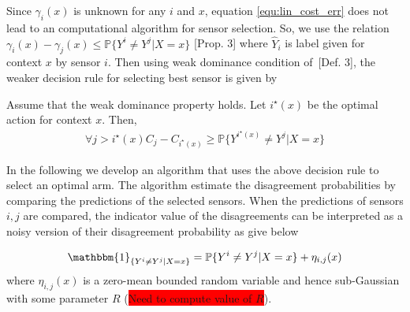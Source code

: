 Since $\gamma_i(x)$ is unknown for any $i$ and $x$, equation \eqref{equ:lin_cost_err} does not lead to an computational algorithm for sensor selection. So, we use the relation $\gamma_i(x)-\gamma_j(x)\leq\mathbb{P}\{Y^i\neq Y^j| X=x\}$ \cite{hanawal2017unsupervised}[Prop. 3] where $\widehat{Y}_i$ is label given for context $x$ by sensor $i$. Then using weak dominance condition of~\cite{hanawal2017unsupervised}[Def. 3], the weaker decision rule for selecting best sensor is given by

\begin{proposition}
Assume that the weak dominance property holds. Let $i^\star(x)$ be the optimal action for context $x$.	Then,
\begin{align}
\label{equ:selection_label}
\forall j > i^\star (x)	C_j - C_{i^\star(x)} \ge \mathbb{P}\{Y^{i^\star(x)}\neq Y^j| X=x\}
\end{align}
\end{proposition}
In the following we develop an algorithm that uses the above decision rule to select an optimal arm. The algorithm estimate the disagreement probabilities by comparing the predictions of the selected sensors. When the predictions of sensors $i,j$ are compared, the indicator value of the disagreements can be interpreted as a noisy version of their disagreement probability as give below

\[\mathbbm{1}_{\{Y^i \neq Y^j|X=x\}} = \mathbb{P}\{Y^i\neq Y^j|X=x\}+ \eta_{i,j}(x)\]
where $\eta_{i,j}(x)$ is a zero-mean bounded random variable and hence sub-Gaussian with some parameter $R$ (\colorbox{red}{Need to compute value of $R$}).
